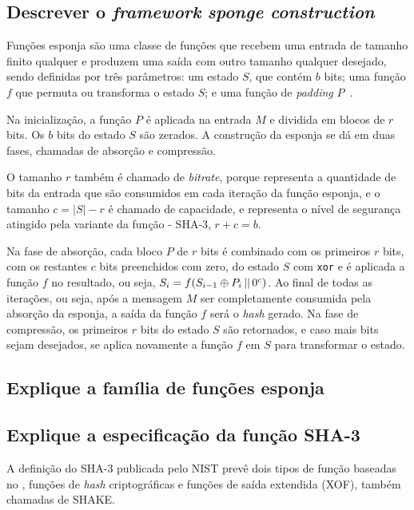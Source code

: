\subsection{Descrever o \textit{framework} \textit{sponge construction}}

Funções esponja são uma classe de funções que recebem uma entrada de tamanho
finito qualquer e produzem uma saída com outro tamanho qualquer desejado, sendo
definidas por três parâmetros: um estado $S$, que contém $b$ bits; uma função
$f$ que permuta ou transforma o estado $S$; e uma função de \textit{padding}
$P$~\cite{noekeon:2011}.

Na inicialização, a função $P$ é aplicada na entrada $M$ e dividida em blocos
de $r$ bits. Os $b$ bits do estado $S$ são zerados. A construção da esponja se
dá em duas fases, chamadas de absorção e compressão.

O tamanho $r$ também é chamado de \textit{bitrate}, porque representa a
quantidade de bits da entrada que são consumidos em cada iteração da função
esponja, e o tamanho $c = |S| - r$ é chamado de capacidade, e representa o
nível de segurança atingido pela variante da função - SHA-3, $r + c = b$.

Na fase de absorção, cada bloco $P$ de $r$ bits é combinado com os primeiros
$r$ bits, com os restantes $c$ bits preenchidos com zero, do estado $S$ com
\texttt{xor} e é aplicada a função $f$ no resultado, ou seja,
$S_{i} = f(S_{i-1} \oplus P_{i} \operatorname{\lvert\rvert} 0^{c})$. Ao final de todas as
iterações, ou seja, após a mensagem $M$ ser completamente consumida pela
absorção da esponja, a saída da função $f$ será o \textit{hash} gerado. Na fase
de compressão, os primeiros $r$ bits do estado $S$ são retornados, e caso mais
bits sejam desejados, se aplica novamente a função $f$ em $S$ para transformar
o estado.

\subsection{Explique a família de funções esponja \Keccak}

\subsection{Explique a especificação da função SHA-3}

A definição do SHA-3 publicada pelo NIST prevê dois tipos de função baseadas no
\Keccak, funções de \textit{hash} criptográficas e funções de saída extendida
(XOF), também chamadas de SHAKE.

